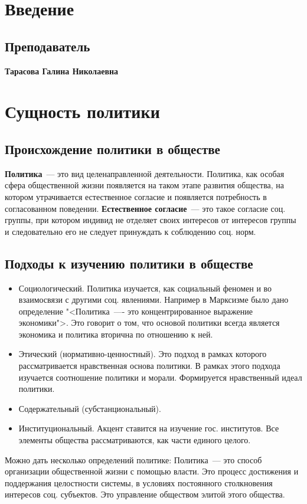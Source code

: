 \section{Введение}
\subsection{Преподаватель}
\textbf{Тарасова Галина Николаевна}

\section{Сущность политики}
\subsection{Происхождение политики в обществе}
\textbf{Политика}~--- это вид целенаправленной деятельности. Политика, как особая сфера общественной жизни появляется на таком этапе развития общества, на котором утрачивается естественное согласие и появляется потребность в согласованном поведении. \textbf{Естественное согласие}~--- это такое согласие соц. группы, при котором индивид не отделяет своих интересов от интересов группы и следовательно его не следует принуждать к соблюдению соц. норм.

\subsection{Подходы к изучению политики в обществе}
\begin{itemize}
	\item Социологический. Политика изучается, как социальный феномен и во взаимосвязи с другими соц. явлениями. Например в Марксизме было дано определение "<Политика~---- это концентрированное выражение экономики">. Это говорит о том, что основой политики всегда является экономика и политика вторична по отношению к ней.
	\item Этический (нормативно-ценностный). Это подход в рамках которого рассматривается нравственная основа политики. В рамках этого подхода изучается соотношение политики и морали. Формируется нравственный идеал политики.
	\item Содержательный (субстанциональный).
	\item Институциональный. Акцент ставится на изучение гос. институтов. Все элементы общества рассматриваются, как части единого целого.
\end{itemize}
Можно дать несколько определений политике: Политика~--- это способ организации общественной жизни с помощью власти. Это процесс достижения и поддержания целостности системы, в условиях постоянного столкновения интересов соц. субъектов. Это управление обществом элитой этого общества.

